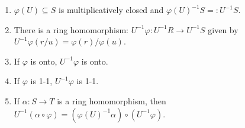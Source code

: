 \begin{proposition}
    \begin{enumerate}
        \item $\varphi(U) \subseteq S$ is multiplicatively closed and $\varphi(U)^{-1}S =: U^{-1}S$.
        \item There is a ring homomorphism: $U^{-1}\varphi: U^{-1}R \to U^{-1}S$ given by $U^{-1}\varphi(r/u) = \varphi(r)/\varphi(u)$.
            \begin{center}
            \end{center}
        \item If $\varphi$ is onto, $U^{-1}\varphi$ is onto.
        \item If $\varphi$ is 1-1, $U^{-1}\varphi$ is 1-1.
        \item If $\alpha: S \to T$ is a ring homomorphism, then $U^{-1}(\alpha \circ \varphi) = (\varphi(U)^{-1}\alpha) \circ (U^{-1}\varphi)$. 
            \begin{center}
            \end{center}
    \end{enumerate}
\end{proposition}

